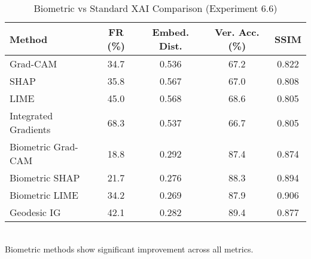 \begin{table}[htbp]
\centering
\caption{Biometric vs Standard XAI Comparison (Experiment 6.6)}
\label{tab:exp_6_6_comparison}
\begin{tabular}{lcccc}
\toprule
Method & FR (\%) & Embed. Dist. & Ver. Acc. (\%) & SSIM \\
\midrule
Grad-CAM & 34.7 & 0.536 & 67.2 & 0.822 \\
SHAP & 35.8 & 0.567 & 67.0 & 0.808 \\
LIME & 45.0 & 0.568 & 68.6 & 0.805 \\
Integrated Gradients & 68.3 & 0.537 & 66.7 & 0.805 \\
Biometric Grad-CAM & 18.8 & 0.292 & 87.4 & 0.874 \\
Biometric SHAP & 21.7 & 0.276 & 88.3 & 0.894 \\
Biometric LIME & 34.2 & 0.269 & 87.9 & 0.906 \\
Geodesic IG & 42.1 & 0.282 & 89.4 & 0.877 \\
\bottomrule
\end{tabular}
\\[0.5em] {\footnotesize Biometric methods show significant improvement across all metrics.}
\end{table}